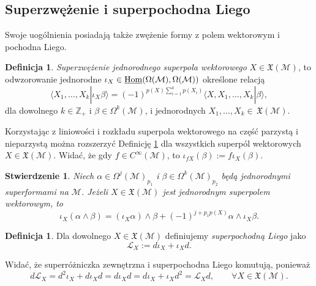 \documentclass[11pt,a4paper]{report}
\newtheorem{proposition}[theorem]{Stwierdzenie}
\theoremstyle{definition}
\newtheorem{definition}[theorem]{Definicja}
\begin{document}
\subsection{Superzwężenie i superpochodna Liego}

Swoje uogólnienia posiadają także zwężenie formy z polem wektorowym i pochodna Liego.

\begin{definition}
\label{def:supercontraction}
\textit{Superzwężenie jednorodnego superpola wektorowego} $X\in \mathfrak{X}(\mathcal{M})$, to odwzorowanie jednorodne $\iota_X\in\underline{{\rm Hom}}(\Omega({\mathcal{M}}),\Omega({\mathcal{M}}))$ określone relacją
\begin{equation*}
\langle X_1,\ldots,X_k|\iota_X \beta\rangle=(-1)^{p(X)\sum_{i=1}^k p(X_i)}\langle X,X_1,\ldots,X_k|\beta\rangle,
\end{equation*}
dla dowolnego $k \in \mathbb{Z}_+$ i $\beta \in \Omega^{k}({\mathcal{M}})$, i jednorodnych $X_1,\ldots,X_k\in \,\mathfrak{X}(\mathcal{M})$.
\end{definition}

Korzystając z liniowości i rozkładu superpola wektorowego na część parzystą i nieparzystą można rozszerzyć Definicję \ref{def:supercontraction} dla wszystkich superpól wektorowych $X \in \mathfrak{X}(\mathcal{M})$. Widać, że gdy $f \in C^\infty(\mathcal{M})$, to $\iota_{fX} (\beta) := f \iota_X (\beta).$

\begin{proposition} 
\label{prop:supercontraction_property}
Niech $\alpha \in \Omega^j (\mathcal{M})_{p_1}\!$ i $\beta\in \Omega^k (\mathcal{M})_{p_2}$ będą jednorodnymi superformami na $\mathcal{M}$. Jeżeli $X\in \mathfrak{X}(\mathcal{M})$ jest jednorodnym superpolem wektorowym, to
\begin{equation*}
	\iota_X(\alpha\wedge\beta)=(\iota_X\alpha)\wedge \beta+(-1)^{j+p_1 p(X)}\alpha\wedge \iota_X\beta.
\end{equation*}
\end{proposition}

\begin{definition} Dla dowolnego $X\in \mathfrak{X}(\mathcal{M})$ definiujemy \textit{superpochodną Liego} jako
\begin{equation*}
	\mathcal{L}_X:=d\iota_X+\iota_Xd.
\end{equation*}
\end{definition}
Widać, że superróżniczka zewnętrzna i superpochodna Liego komutują, ponieważ
\begin{equation*}
d\mathcal{L}_X = d^2\iota_{X}+d\iota_Xd=d\iota_Xd=d\iota_X+\iota_Xd^2=\mathcal{L}_Xd,\qquad \forall X\in \mathfrak{X}(\mathcal{M}).
\end{equation*}
\end{document}
